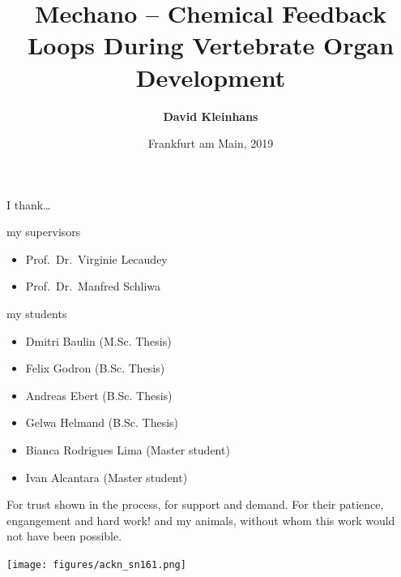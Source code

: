 \documentclass[11pt,singlespacinge,twoside]{reedthesis} %
\title{\textbf{Mechano -- Chemical Feedback Loops \linebreak During Vertebrate Organ Development}}
\author{\textbf{David Kleinhans}}
\date{Frankfurt am Main, 2019}
\providecommand{\tightlist}{%
  \setlength{\itemsep}{0pt}\setlength{\parskip}{0pt}}
\begin{document}

  \maketitle

\frontmatter
{}
\pagestyle{empty} %
  \begin{acknowledgements}
    I thank\ldots{}\newline
    
    \noindent my supervisors
    \begin{itemize}
    \tightlist
    \item
      Prof.~Dr.~Virginie Lecaudey
    \item
      Prof.~Dr.~Manfred Schliwa
    \end{itemize}
    \noindent my students
    \begin{itemize}
    \tightlist
    \item
      Dmitri Baulin (M.Sc. Thesis)
    \item
      Felix Godron (B.Sc. Thesis)
    \item
      Andreas Ebert (B.Sc. Thesis)
    \item
      Gelwa Helmand (B.Sc. Thesis)
    \item
      Bianca Rodrigues Lima (Master student)
    \item
      Ivan Alcantara (Master student)
    \end{itemize}
    For trust shown in the process, for support and demand. \newline For their patience, engangement and hard work!
    \newline\newline
    \noindent and my animals, without whom this work would not have been possible.
    \vspace{0.2cm}
    \begin{center}
      \texttt{[image: figures/ackn\_sn161.png]}
    \end{center}
  \end{acknowledgements}

  \hypersetup{linkcolor=black}
  \setcounter{tocdepth}{2}
  \tableofcontents

  \listoftables
\end{document}
